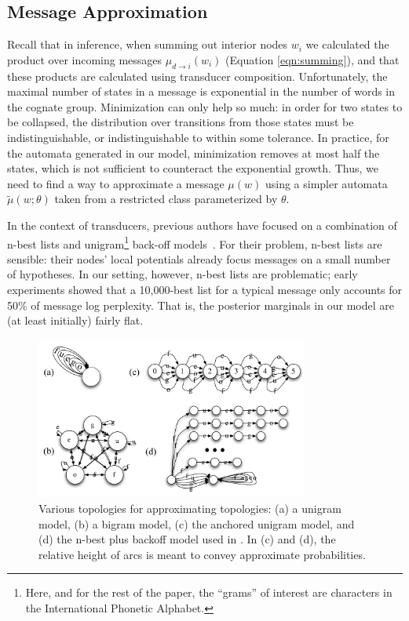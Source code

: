 \documentclass[11pt,a4paper]{article}
\begin{document}
\subsection{Message Approximation}
\label{sec:approx}

Recall that in inference, when summing out interior nodes $w_i$ we
calculated the product over incoming messages $\mu_{d\to i}(w_i)$
(Equation \ref{eqn:summing}), and that these products are calculated
using transducer composition. Unfortunately, the maximal number of
states in a message is exponential in the number of words in the
cognate group. Minimization can only help so much: in order for two
states to be collapsed, the distribution over transitions from those
states must be indistinguishable, or indistinguishable to within
some tolerance. In practice, for the automata generated in our
model, minimization removes at most half the states, which is not
sufficient to counteract the exponential growth. Thus, we need to
find a way to approximate a message $\mu(w)$ using a simpler automata
$\tilde\mu(w;\theta)$ taken from a restricted class parameterized
by $\theta$.

In the context of transducers, previous authors have focused on a
combination of n-best lists and unigram\footnote{Here, and for the
rest of the paper, the ``grams'' of interest are characters in the
International Phonetic Alphabet.} back-off
models~\cite{dreyer2009graphical}.  For their problem, n-best lists
are sensible: their nodes' local potentials already focus messages
on a small number of hypotheses.  In our setting, however, n-best
lists are problematic; early experiments showed that a 10,000-best
list for a typical message only accounts for 50\% of message log
perplexity. That is, the posterior marginals in our model are (at
least initially) fairly flat.

\begin{figure}
  \centering
  \includegraphics[scale=0.4,height=2.1in]{fsa}
  \caption{Various topologies for approximating topologies: (a) a
  unigram model, (b) a bigram model, (c) the anchored unigram model,
  and (d) the n-best plus backoff model used in
  . In (c) and (d), the relative height
  of arcs is meant to convey approximate probabilities.}
  \label{fig:fsa}
\end{figure}
\end{document}
